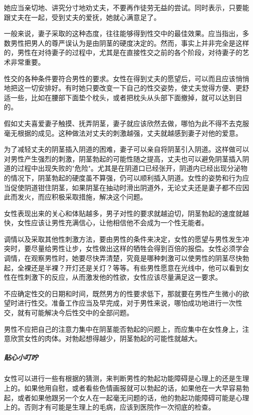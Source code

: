 她应当亲切地、讲究分寸地劝丈夫，不要再作徒劳无益的尝试。同时表示，只要能跟丈夫在一起，受到丈夫的爱抚，她就心满意足了。

一般来说，妻子采取的这种态度，往往能够得到性交中的最佳效果。应当指出，多数男性把男人的尊严误认为是由阴茎的硬度决定的。然而，事实上并非完全是这样的，男性在对待妻子的过程中，尤其是在直接性交之前的各个阶段，对待妻子的艺术非常重要。

性交的各种条件要符合男性的要求。女性在得到丈夫的愿望后，可以而且应该悄悄地把这一切安排好。有时她只要改变一下自己的性交姿势，使丈夫觉得方便、更舒适一些，比如在腰部下面垫个枕头，或者把枕头从头部下面撤掉，就可以达到目的。

假如丈夫喜爱妻子触摸、抚弄阴茎，妻子就应该欣然去做，哪怕为此不得不去克服毫无根据的成见。这种做法对丈夫的刺激越强，丈夫就越感到妻子对他的爱意。

为了减轻丈夫的阴茎插入阴道的困难，妻子可以亲自将阴茎引入阴道。这样做可以对男性产生强烈的刺激，阴茎勃起的可能性随之提高，丈夫也可以避免阴茎插入阴道的过程中出现失败的"危险"。尤其是在阴道口已经张开，阴道内已经出现分泌物的情况下，阴茎勃起的硬度虽不算强，仍可以顺利插入阴道。女性的姿势和行为应当促使阴道钳住阴茎，如果阴茎在抽动时滑出阴道外，无论丈夫还是妻子都不应因此而发火，而应积极采取措施，解决这个问题。

女性表现出来的关心和体贴越多，男子对性的要求就越迫切，阴茎勃起的速度就越快，女性应该让男性充满信心，让他相信他不会成为一个性无能者。

调情以及采取其他性刺激方法，要由男性的条件来决定，女性的愿望与男性发生冲突时，要尽量给男性让步，女性做出这样的牺牲会得到百倍的报偿。女性必须学会调情，在观察男性时，她要尽快弄清楚，究竟是哪种刺激可以使男性的阴茎尽快勃起，全裸还是半裸？开灯还是关灯？等等。有些男性愿意在光线中，他可以看到女性在性刺激下的反应，从而激发他的性欲，女性应该尽量满足这一要求。

不应确定性交的日期和时间，既然男方的性要求低下，那就要在男性产生微小的欲望时进行性交。准备工作应当及早完成，对于男性来说，哪怕成功地进行一次性交，就有可能解决今后性交中的全部问题。

男性不应把自己的注意力集中在阴茎能否勃起的问题上，而应集中在女性身上，注意欣赏女性的肉体。对勃起想得越少，阴茎勃起的可能性就越大。

\subparagraph{贴心小叮咛}

女性可以进行一些有根据的猜测，来判断男性的勃起功能障碍是心理上的还是生理上的。如果他用自慰，或者看些色情画报就可以勃起的话，如果他在一大早容易勃起，或者如果他跟另一个女人在一起毫无问题的话，他的勃起功能障碍可能是心理上的。否则才有可能是生理上的毛病，应该到医院作一次彻底的检查。

